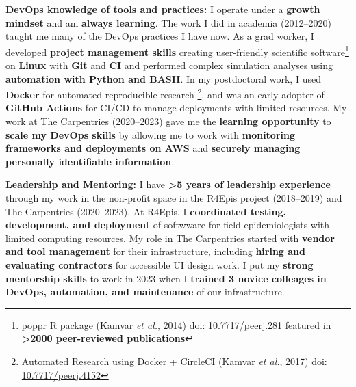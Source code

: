\underline{\textbf{DevOps knowledge of tools and practices:}}
I operate under a \textbf{growth mindset} and am \textbf{always learning}.
The work I did in academia (2012--2020) taught me many of the DevOps practices I have now.
As a grad worker, I developed \textbf{project management skills} creating user-friendly scientific software\footnote{poppr R package (Kamvar \textit{et al.}, 2014) doi: \href{https://doi.org/10.7717/peerj.281}{10.7717/peerj.281} featured in \textbf{\textgreater2000 peer-reviewed publications}} on \textbf{Linux} with \textbf{Git} and \textbf{CI} and 
performed complex simulation analyses using \textbf{automation with Python and BASH}.
In my postdoctoral work, I used \textbf{Docker} for automated reproducible research \footnote{Automated Research using Docker + CircleCI (Kamvar \textit{et al.}, 2017) doi: \href{https://doi.org/10.7717/peerj.4152}{10.7717/peerj.4152}}, 
and was an early adopter of \textbf{GitHub Actions} for CI/CD to manage deployments with limited resources.
My work at The Carpentries (2020--2023) gave me the \textbf{learning opportunity} to \textbf{scale my DevOps skills} by allowing me to work with \textbf{monitoring frameworks and deployments on AWS} and \textbf{securely managing personally identifiable information}. 





\vspace{2ex}

\underline{\textbf{Leadership and Mentoring:}}
I have \textbf{\textgreater5 years of leadership experience} through my work in the non-profit space in the R4Epis project (2018--2019) and The Carpentries (2020--2023).
At R4Epis, I \textbf{coordinated testing, development, and deployment} of softwware for field epidemiologists with limited computing resources.
My role in The Carpentries started with \textbf{vendor and tool management} for their infrastructure, including \textbf{hiring and evaluating contractors} for accessible UI design work.
I put my \textbf{strong mentorship skills} to work in 2023 when I \textbf{trained 3 novice colleages in DevOps, automation, and maintenance} of our infrastructure.

